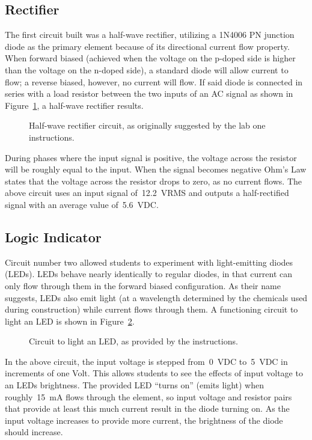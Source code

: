 \subsection{Rectifier}
The first circuit built was a half-wave rectifier, utilizing a 1N4006 PN
junction diode as the primary element because of its directional current flow
property.  When forward biased (achieved when the voltage on the p-doped side
is higher than the voltage on the n-doped side), a standard diode will allow
current to flow; a reverse biased, however, no current will flow.  If said
diode is connected in series with a load resistor between the two inputs of an
AC signal as shown in Figure~\ref{fig:schem1}, a half-wave rectifier results.
%
\begin{figure}[H]
	\centering
	
	\parbox{3.5in}{
	\caption{Half-wave rectifier circuit, as originally suggested by the lab
	one instructions.}
	\label{fig:schem1}}
\end{figure}
%
During phases where the input signal is positive, the voltage across the
resistor will be roughly equal to the input.  When the signal becomes negative
Ohm's Law states that the voltage across the resistor drops to zero, as no
current flows.  The above circuit uses an input signal of~\SI{12.2}{\volt}RMS
and outputs a half-rectified signal with an average value of~\SI{5.6}{\volt}DC.

\subsection{Logic Indicator}
Circuit number two allowed students to experiment with light-emitting diodes
(LEDs).  LEDs behave nearly identically to regular diodes, in that current can
only flow through them in the forward biased configuration.  As their name
suggests, LEDs also emit light (at a wavelength determined by the chemicals
used during construction) while current flows through them.  A functioning
circuit to light an LED is shown in Figure~\ref{fig:schem2}.
%
\begin{figure}[H]
	\centering
	
	\parbox{3.5in}{
	\caption{Circuit to light an LED, as provided by the instructions.}
	\label{fig:schem2}}
\end{figure}
%
In the above circuit, the input voltage is stepped from~\SI{0}{\volt}DC
to~\SI{5}{\volt}DC in increments of one Volt.  This allows students to see the
effects of input voltage to an LEDs brightness.  The provided LED ``turns on''
(emits light) when roughly~\SI{15}{\milli\ampere} flows through the element, so
input voltage and resistor pairs that provide at least this much current result
in the diode turning on.  As the input voltage increases to provide more
current, the brightness of the diode should increase.


